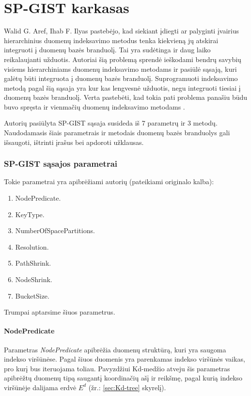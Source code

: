 \section{SP-GIST karkasas}

Walid G. Aref, Ihab F. Ilyas \cite{aref2001sp} pastebėjo, kad siekiant įdiegti ar palyginti įvairius hierarchinius duomenų indeksavimo metodus tenka kiekvieną jų atskirai integruoti į duomenų bazės branduolį.
Tai yra sudėtinga ir daug laiko reikalaujanti užduotis.
Autoriai šią problemą sprendė ieškodami bendrų savybių visiems hierarchiniams duomenų indeksavimo metodams ir pasiūlė sąsają, kuri galėtų būti integruota į duomenų bazės branduolį.
Suprogramuoti indeksavimo metodą pagal šią sąsaja yra kur kas lengvesnė užduotis, negu integruoti tiesiai į duomenų bazės branduolį.
Verta pastebėti, kad tokia pati problema panašiu būdu buvo spręsta ir vienmačių duomenų indeksavimo metodams \cite{hellerstein1995generalized}.

Autorių pasiūlyta SP-GIST sąsaja susideda iš 7 parametrų ir 3 metodų.
Naudodamasis šiais parametrais ir metodais duomenų bazės branduolys gali išsaugoti, ištrinti įrašus bei apdoroti užklausas.

\subsubsection{SP-GIST sąsajos parametrai}
Tokie parametrai yra apibrėžiami autorių (pateikiami originalo kalba):
\begin{enumerate}
	\item NodePredicate.
	\item KeyType.
	\item NumberOfSpacePartitions.
	\item Resolution.
	\item PathShrink.
	\item NodeShrink.
	\item BucketSize.
\end{enumerate}

Trumpai aptarsime šiuos parametrus.

\paragraph{NodePredicate}
Parametras {\it NodePredicate} apibrėžia duomenų struktūrą, kuri yra saugoma indekso viršūnėse.
Pagal šiuos duomenis yra parenkamas indekso viršūnės vaikas, pro kurį bus iteruojama toliau.
Pavyzdžiui Kd-medžio atveju šis parametras apibrėžtų duomenų tipą saugantį koordinačių ašį ir reikšmę, pagal kurią indekso viršūnėje dalijama erdvė $E^d$ (žr.: \ref{sec:Kd-tree} skyrelį).

